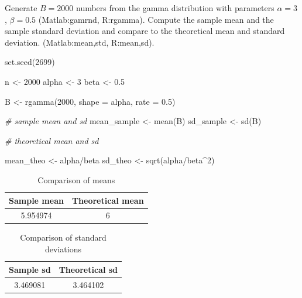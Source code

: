 \documentclass[
  10pt,
]{article}
\newenvironment{Shaded}{\begin{snugshade}}{\end{snugshade}}
\newcommand{\AttributeTok}[1]{\textcolor[rgb]{0.77,0.63,0.00}{#1}}
\newcommand{\CommentTok}[1]{\textcolor[rgb]{0.56,0.35,0.01}{\textit{#1}}}
\newcommand{\DecValTok}[1]{\textcolor[rgb]{0.00,0.00,0.81}{#1}}
\newcommand{\FloatTok}[1]{\textcolor[rgb]{0.00,0.00,0.81}{#1}}
\newcommand{\FunctionTok}[1]{\textcolor[rgb]{0.00,0.00,0.00}{#1}}
\newcommand{\NormalTok}[1]{#1}
\newcommand{\OtherTok}[1]{\textcolor[rgb]{0.56,0.35,0.01}{#1}}
\newcommand{\SpecialCharTok}[1]{\textcolor[rgb]{0.00,0.00,0.00}{#1}}
\begin{document}
Generate \(B = 2000\) numbers from the gamma distribution with parameters \(\alpha = 3\) , \(\beta = 0.5\) (Matlab:gamrnd, R:rgamma). Compute the sample mean and the sample standard deviation and compare to the theoretical mean and standard deviation. (Matlab:mean,std, R:mean,sd).

\begin{Shaded}
\begin{Highlighting}[]
\FunctionTok{set.seed}\NormalTok{(}\DecValTok{2699}\NormalTok{)}

\NormalTok{n }\OtherTok{\textless{}{-}} \DecValTok{2000}
\NormalTok{alpha }\OtherTok{\textless{}{-}} \DecValTok{3}
\NormalTok{beta }\OtherTok{\textless{}{-}} \FloatTok{0.5}

\NormalTok{B }\OtherTok{\textless{}{-}} \FunctionTok{rgamma}\NormalTok{(}\DecValTok{2000}\NormalTok{, }\AttributeTok{shape =}\NormalTok{ alpha, }\AttributeTok{rate =} \FloatTok{0.5}\NormalTok{)}

\CommentTok{\# sample mean and sd}
\NormalTok{mean\_sample }\OtherTok{\textless{}{-}} \FunctionTok{mean}\NormalTok{(B)}
\NormalTok{sd\_sample }\OtherTok{\textless{}{-}} \FunctionTok{sd}\NormalTok{(B)}

\CommentTok{\# theoretical mean and sd}

\NormalTok{mean\_theo }\OtherTok{\textless{}{-}}\NormalTok{ alpha}\SpecialCharTok{/}\NormalTok{beta}
\NormalTok{sd\_theo }\OtherTok{\textless{}{-}} \FunctionTok{sqrt}\NormalTok{(alpha}\SpecialCharTok{/}\NormalTok{beta}\SpecialCharTok{\^{}}\DecValTok{2}\NormalTok{)}
\end{Highlighting}
\end{Shaded}

\begin{table}[!h]

\caption{\label{tab:unnamed-chunk-6} Comparison of means}
\centering
\begin{tabular}[t]{cc}
\toprule
\textbf{Sample mean} & \textbf{Theoretical mean}\\
\midrule
5.954974 & 6\\
\bottomrule
\end{tabular}
\end{table}

\begin{table}[!h]

\caption{\label{tab:unnamed-chunk-7} Comparison of standard deviations}
\centering
\begin{tabular}[t]{cc}
\toprule
\textbf{Sample sd} & \textbf{Theoretical sd}\\
\midrule
3.469081 & 3.464102\\
\bottomrule
\end{tabular}
\end{table}
\end{document}
